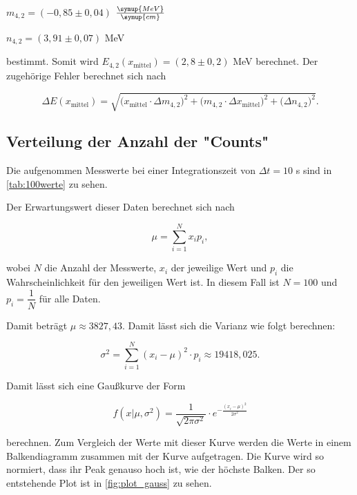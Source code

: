 \begin{center}
    $m_{4,2} = (-0,85 \pm 0,04)$ $\frac{\symup{MeV}}{\symup{cm}}$

    $n_{4,2} = (3,91 \pm 0,07)$ MeV
\end{center}

bestimmt.
Somit wird $E_{4,2}(x_\text{mittel}) = (2,8 \pm 0,2)$ MeV berechnet. Der zugehörige Fehler berechnet sich nach

\begin{equation}
    \Delta E(x_\text{mittel}) = \sqrt{\bigg( x_\text{mittel} \cdot \Delta m_{4,2} \bigg)^2 + \bigg(m_{4,2} \cdot \Delta x_\text{mittel} \bigg)^2 + \bigg(\Delta n_{4,2} \bigg)^2}.
\end{equation}




\subsection{Verteilung der Anzahl der "Counts"}

Die aufgenommen Messwerte bei einer Integrationszeit von $\Delta t = 10$ s sind in \autoref{tab:100werte} zu sehen.



Der Erwartungswert dieser Daten berechnet sich nach

\begin{equation}
    \mu = \sum_{i=1}^{N} x_i p_i,
\end{equation}

wobei $N$ die Anzahl der Messwerte, $x_i$ der jeweilige Wert und $p_i$ die Wahrscheinlichkeit für den jeweiligen Wert ist.
In diesem Fall ist $N = 100$ und $p_i = \dfrac{1}{N}$ für alle Daten.

Damit beträgt $\mu \approx 3827,43$.
Damit lässt sich die Varianz wie folgt berechnen:

\begin{equation}
    \sigma^2 = \sum_{i=1}^{N} (x_i - \mu)^2 \cdot p_i \approx 19418,025.
\end{equation}

Damit lässt sich eine Gaußkurve der Form

\begin{equation}
    f(x | \mu, \sigma^2) = \frac{1}{\sqrt{2 \pi \sigma^2}} \cdot e^{- \frac{(x_i - \mu)^2}{2 \sigma^2}}
\end{equation}

berechnen. Zum Vergleich der Werte mit dieser Kurve werden die Werte in einem Balkendiagramm zusammen mit der Kurve aufgetragen.
Die Kurve wird so normiert, dass ihr Peak genauso hoch ist, wie der höchste Balken. Der so entstehende Plot ist in \autoref{fig:plot_gauss} zu sehen.

